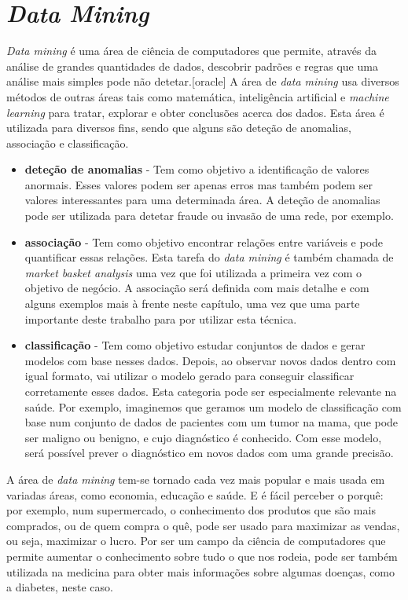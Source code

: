 \section{\textit{Data Mining}}

\textit{Data mining} é uma área de ciência de computadores que permite, através da análise de grandes quantidades de dados, descobrir padrões e regras que uma análise mais simples pode não detetar.[oracle]
A área de \textit{data mining} usa diversos métodos de outras áreas tais como matemática, inteligência artificial e \textit{machine learning} para tratar, explorar e obter conclusões acerca dos dados. Esta área é utilizada para diversos fins, sendo que alguns são deteção de anomalias, associação e classificação. 

\begin{itemize}

\item{\textbf{deteção de anomalias}} - 
Tem como objetivo a identificação de valores anormais. Esses valores podem ser apenas erros mas também podem ser valores interessantes para uma determinada área. A deteção de anomalias pode ser utilizada para detetar fraude ou invasão de uma rede, por exemplo.

\item{\textbf{associação}} - 
Tem como objetivo encontrar relações entre variáveis e pode quantificar essas relações. Esta tarefa do \textit{data mining} é também chamada de \textit{market basket analysis} uma vez que foi utilizada a primeira vez com o objetivo de negócio. A associação será definida com mais detalhe e com alguns exemplos mais à frente neste capítulo, uma vez que uma parte importante deste trabalho para por utilizar esta técnica. 

\item{\textbf{classificação}} - 
Tem como objetivo estudar conjuntos de dados e gerar modelos com base nesses dados. Depois, ao observar novos dados dentro com igual formato, vai utilizar o modelo gerado para conseguir classificar corretamente esses dados. Esta categoria pode ser especialmente relevante na saúde. Por exemplo, imaginemos que geramos um modelo de classificação com base num conjunto de dados de pacientes com um tumor na mama, que pode ser maligno ou benigno, e cujo diagnóstico é conhecido. Com esse modelo, será possível prever o diagnóstico em novos dados com uma grande precisão. 


\end{itemize}

A área de \textit{data mining} tem-se tornado cada vez mais popular e mais usada em variadas áreas, como economia, educação e saúde. E é fácil perceber o porquê: por exemplo, num supermercado, o conhecimento dos produtos que são mais comprados, ou de quem compra o quê, pode ser usado para maximizar as vendas, ou seja, maximizar o lucro. Por ser um campo da ciência de computadores que permite aumentar o conhecimento sobre tudo o que nos rodeia, pode ser também utilizada na medicina para obter mais informações sobre algumas doenças, como a diabetes, neste caso.

